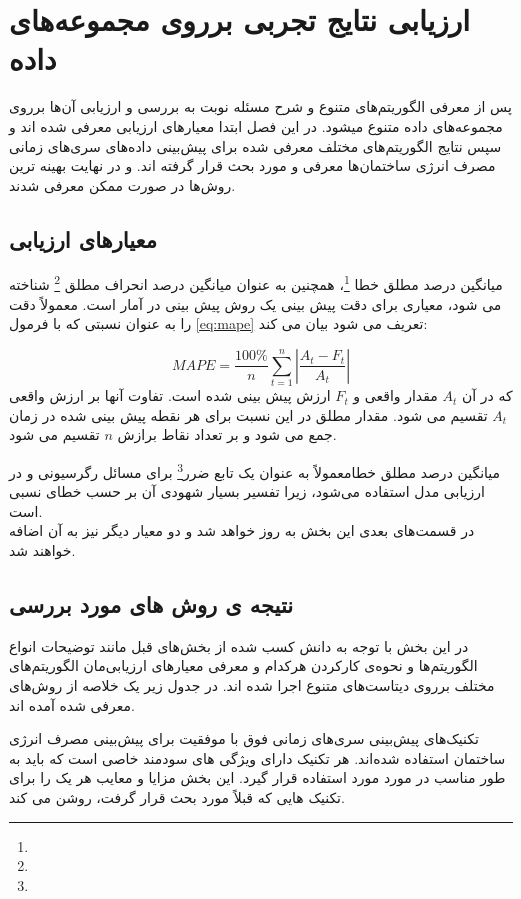 \chapter{ارزیابی نتایج تجربی برروی مجموعه‌های داده}

پس از معرفی الگوریتم‌های متنوع و شرح مسئله نوبت به بررسی و ارزیابی آن‌ها برروی مجموعه‌های داده‌ متنوع میشود. در این فصل ابتدا معیار‌های ارزیابی معرفی شده اند و سپس 
نتایج الگوریتم‌های مختلف معرفی شده برای پیش‌بینی داده‌های سری‌های زمانی مصرف انرژی ساختمان‌ها معرفی و مورد بحث قرار گرفته اند.
و در نهایت بهینه ترین روش‌ها در صورت ممکن معرفی شدند.
\section{معیار‌های ارزیابی}

میانگین درصد مطلق خطا \footnote{}، همچنین به عنوان میانگین درصد انحراف مطلق \footnote{}
 شناخته می شود، معیاری برای دقت پیش بینی یک روش پیش بینی در آمار است. معمولاً دقت را به عنوان نسبتی که با فرمول \ref{eq:mape} تعریف می شود بیان می کند:

 \begin{equation}\label{eq:mape}
    MAPE = \frac{100\%}{n}\sum_{t=1}^{n}\left |\frac{A_t - F_t}{A_t}\right|
\end{equation}
\noindent
که در آن $A_t$ مقدار واقعی و $F_t$ ارزش پیش بینی شده است. تفاوت آنها بر ارزش واقعی $A_t$ تقسیم می شود. مقدار مطلق در این نسبت برای هر نقطه پیش بینی شده
 در زمان جمع می شود
 و بر تعداد نقاط برازش $n$ تقسیم می شود.

 
 \noindent
 میانگین درصد مطلق خطا\footnotemark[1] معمولاً به عنوان یک تابع ضرر\footnote{} برای مسائل رگرسیونی و در ارزیابی مدل استفاده می‌شود،
 زیرا تفسیر بسیار شهودی آن بر حسب خطای نسبی است.
 \\
 در قسمت‌های بعدی این بخش به روز خواهد شد و دو معیار دیگر نیز به آن اضافه خواهند شد.

\section{نتیجه ی روش های مورد بررسی}
در این بخش با توجه به دانش کسب شده از بخش‌های قبل 
مانند توضیحات انواع الگوریتم‌ها و نحوه‌ی کارکردن هرکدام و معرفی معیار‌های ارزیابی‌مان الگوریتم‌های مختلف  برروی دیتاست‌های متنوع اجرا شده اند.
در جدول زیر یک خلاصه از روش‌های معرفی شده آمده اند.

تکنیک‌های پیش‌بینی سری‌های زمانی فوق با موفقیت برای پیش‌بینی مصرف انرژی ساختمان استفاده شده‌اند. هر تکنیک دارای ویژگی های سودمند خاصی است که باید به طور مناسب در مورد مورد استفاده قرار گیرد. 
این بخش مزایا و معایب هر یک را برای تکنیک هایی که قبلاً مورد بحث قرار گرفت، روشن می کند.

